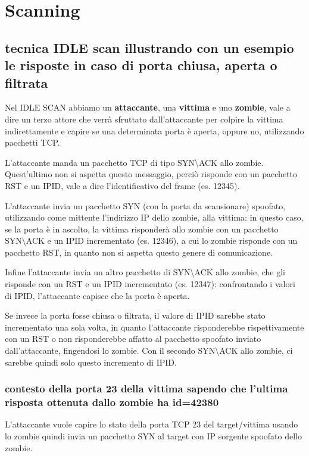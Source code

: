\documentclass{report}
\begin{document}
\chapter{Scanning}
\section{tecnica IDLE scan illustrando con un esempio le risposte in caso di porta chiusa, aperta o filtrata}
Nel IDLE SCAN abbiamo un \textbf{attaccante}, una \textbf{vittima} e uno \textbf{zombie}, vale a dire un terzo attore che verrà sfruttato dall'attaccante per colpire la vittima indirettamente
e capire se una determinata porta è aperta, oppure no, utilizzando pacchetti TCP.

\noindent L'attaccante manda un pacchetto TCP di tipo SYN\textbackslash ACK allo zombie. Quest'ultimo non si aspetta questo messaggio, perciò risponde con un pacchetto RST e un IPID, vale a dire l'identificativo del frame (es. 12345).

\noindent L'attaccante invia un pacchetto SYN (con la porta da scansionare) spoofato, utilizzando come mittente l'indirizzo IP dello zombie, alla vittima: in questo caso, se la porta è in ascolto, la vittima risponderà 
allo zombie con un pacchetto SYN\textbackslash ACK e un IPID incrementato (es. 12346), a cui lo zombie risponde con un pacchetto RST, in quanto non si aspetta questo genere di comunicazione.

\noindent Infine l'attaccante invia un altro pacchetto di SYN\textbackslash ACK allo zombie, che gli risponde con un RST e un IPID incrementato (es. 12347): confrontando i valori di IPID, l'attaccante capisce che la porta è aperta.

\noindent Se invece la porta fosse chiusa o filtrata, il valore di IPID sarebbe stato incrementato una sola volta, in quanto l'attaccante risponderebbe rispettivamente con un RST o non risponderebbe affatto al pacchetto 
spoofato inviato dall'attaccante, fingendosi lo zombie. 
Con il secondo SYN\textbackslash ACK allo zombie, ci sarebbe quindi solo questo incremento di IPID.

\subsection{contesto della porta 23 della vittima sapendo che l'ultima risposta ottenuta dallo zombie ha id=42380}
L'attaccante vuole capire lo stato della porta TCP 23 del target/vittima usando lo zombie
quindi invia un pacchetto SYN al target con IP sorgente spoofato dello zombie.
\end{document}
